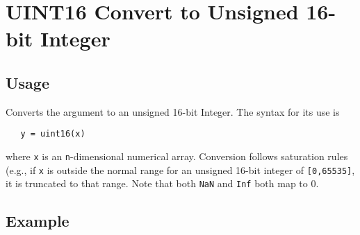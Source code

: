 \section{UINT16 Convert to Unsigned 16-bit Integer}

\subsection{Usage}

Converts the argument to an unsigned 16-bit Integer.  The syntax
for its use is
\begin{verbatim}
   y = uint16(x)
\end{verbatim}
where \verb|x| is an \verb|n|-dimensional numerical array.  Conversion
follows saturation rules (e.g., if \verb|x| is outside the normal
range for an unsigned 16-bit integer of \verb|[0,65535]|, it is truncated
to that range.  Note that
both \verb|NaN| and \verb|Inf| both map to 0.
\subsection{Example}

